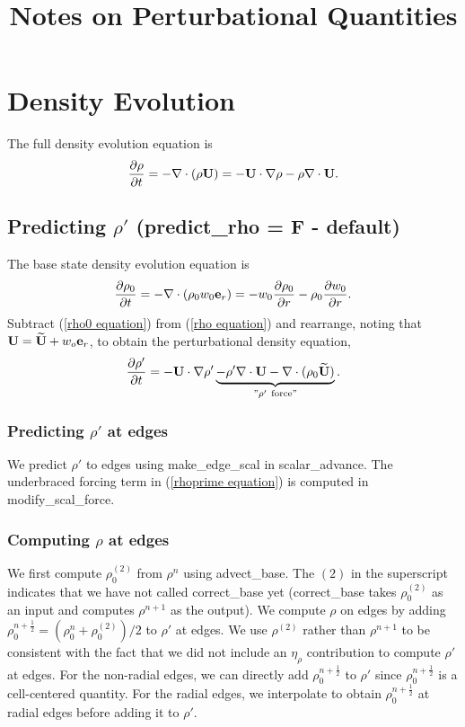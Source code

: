 \documentclass[11pt]{article}
\title{Notes on Perturbational Quantities}
\def\half  {\frac{1}{2}}
\def\eb    {{\bf e}}
\def\Ub    {{\bf U}}
\def\Ubt   {\widetilde{\bf U}}
\begin{document}
\maketitle
\tableofcontents
\cleardoublepage

\section{Density Evolution}
The full density evolution equation is
\begin{equation}
\frac{\partial\rho}{\partial t} = -\nabla\cdot(\rho\Ub) = -\Ub\cdot\nabla\rho 
- \rho\nabla\cdot\Ub. \label{rho equation}
\end{equation}
\subsection{Predicting $\rho'$ (predict\_rho = F - default)}
The base state density evolution equation is
\begin{equation}
\frac{\partial\rho_0}{\partial t} = -\nabla\cdot(\rho_0 w_0 \eb_r) = 
-w_0\frac{\partial\rho_0}{\partial r} - \rho_0\frac{\partial w_0}{\partial r}.
\label{rho0 equation}
\end{equation}
Subtract (\ref{rho0 equation}) from (\ref{rho equation}) and rearrange, noting that 
$\Ub = \Ubt + w_o\eb_r$, to obtain the perturbational density equation,
\begin{equation}
\frac{\partial\rho'}{\partial t} = -\Ub\cdot\nabla\rho' \underbrace{- \rho'\nabla\cdot\Ub 
- \nabla\cdot(\rho_0\Ubt)}_{"\rho' ~ \text{force}"}. 
\label{rhoprime equation}
\end{equation}
\subsubsection{Predicting $\rho'$ at edges}
We predict $\rho'$ to edges using make\_edge\_scal in scalar\_advance.  The underbraced 
forcing term in (\ref{rhoprime equation}) is computed in modify\_scal\_force.
\subsubsection{Computing $\rho$ at edges}\label{Computing rho at edges}
We first compute $\rho_0^{(2)}$ from $\rho^n$ using advect\_base.  The $(2)$ in the 
superscript indicates that we have not called correct\_base yet (correct\_base takes 
$\rho_0^{(2)}$ as an input and computes $\rho^{n+1}$ as the output).  We compute $\rho$ on 
edges by adding $\rho_0^{n+\half} = (\rho_0^n + \rho_0^{(2)}) / 2$ to $\rho'$ at edges.  We 
use $\rho^{(2)}$ rather than $\rho^{n+1}$ to be consistent with the fact that we did not 
include an $\eta_\rho$ contribution to compute $\rho'$ at edges.  For the non-radial edges, 
we can directly add $\rho_0^{n+\half}$ to $\rho'$ since $\rho_0^{n+\half}$ is a cell-centered 
quantity.  For the radial edges, we interpolate to obtain $\rho_0^{n+\half}$ at radial edges 
before adding it to $\rho'$.
\end{document}
